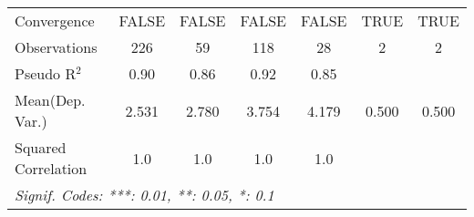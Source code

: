 \begin{tabular}{lcccccc}
   Convergence                                             &FALSE       & FALSE                     & FALSE         & FALSE          & TRUE & TRUE\\  
   Observations                                            & 226        & 59                        & 118           & 28             & 2    & 2\\  
   Pseudo R$^2$                                            & 0.90       & 0.86                      & 0.92          & 0.85           &      & \\  
Mean(Dep. Var.) & 2.531 & 2.780 & 3.754 & 4.179 & 0.500 & 0.500 \\
   Squared Correlation                                     & 1.0        & 1.0                       & 1.0           & 1.0            &      & \\  
   \midrule \midrule
   \multicolumn{7}{l}{\emph{Signif. Codes: ***: 0.01, **: 0.05, *: 0.1}}\\
\end{tabular}
\par\endgroup
